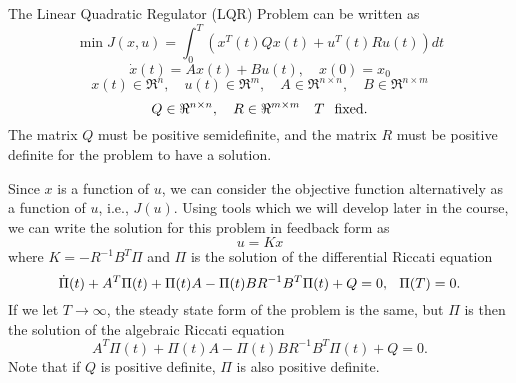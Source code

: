 The Linear Quadratic Regulator (LQR) Problem can be written as
$$\min J(x,u) = \int_0^{T} \left(x^T(t)Qx(t) + u^T(t)Ru(t) \right)dt$$
\hspace{1.5in}{\it subject to}
$$\dot x(t) = Ax(t) + Bu(t), \quad x(0) = x_0$$
$$ x(t) \in \Re^n, \quad u(t) \in \Re^m, \quad A\in\Re ^{n\times n}, \quad B\in \Re ^{n\times m}$$
$$Q\in\Re ^{n\times n}, \quad R\in \Re ^{m\times m}\quad T \hspace{.1in}{\rm fixed}.$$
The matrix $Q$ must be positive semidefinite, and the matrix $R$ must be positive definite for the problem to have a solution.

Since $x$ is a function of $u$, we can consider the objective function alternatively as a function of $u$, i.e., $J(u)$. Using tools which we will develop later in the
course, we can write the solution for this problem in feedback form as 
$$u = Kx$$
where $K = -R^{-1}B^T \Pi$ and $\Pi$ is the solution of the differential Riccati equation
\begin{equation}\label{eq:dre}
\dot{\Pi}(t) +A^T\Pi(t) +\Pi(t)A - \Pi(t)BR^{-1}B^T\Pi(t) +Q =0, \hspace{.1in}  \Pi(T) = 0.
\end{equation}
If we let $T\rightarrow\infty$, the steady state form of the problem is the same, but $\Pi$ is then the solution of the algebraic Riccati equation
\begin{equation}\label{eq:are}
A^T\Pi(t) + \Pi(t)A - \Pi(t)BR^{-1}B^T\Pi(t) +Q=0.
\end{equation}
Note that if $Q$ is positive definite, $\Pi$ is also positive definite.

